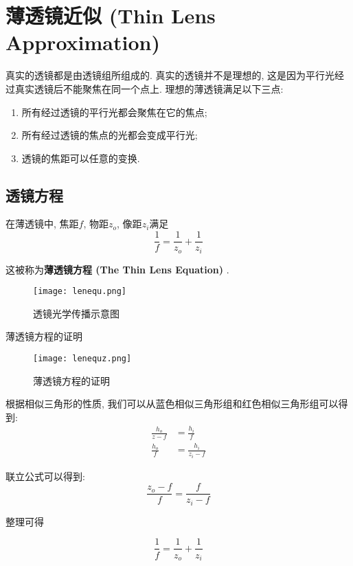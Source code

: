 \documentclass[openany]{progbookcn}
\begin{document}
\section{薄透镜近似 (Thin Lens Approximation) }

真实的透镜都是由透镜组所组成的. 真实的透镜并不是理想的, 这是因为平行光经过真实透镜后不能聚焦在同一个点上. 理想的薄透镜满足以下三点: 
\begin{enumerate}
	\item 所有经过透镜的平行光都会聚焦在它的焦点; 
	\item 所有经过透镜的焦点的光都会变成平行光; 
	\item 透镜的焦距可以任意的变换. 
\end{enumerate}

\subsection{透镜方程}

在薄透镜中, 焦距$f$, 物距$z_o$, 像距$z_i$满足
\begin{equation}
	\frac{1}{f}=\frac{1}{z_o}+\frac{1}{z_i}
\end{equation}

这被称为\textbf{薄透镜方程 (The Thin Lens Equation) }. 

\begin{figure}[H]
	\centering
	\texttt{[image: lenequ.png]}
	\caption{透镜光学传播示意图}
	\label{fig:lenequ}
\end{figure}

\begin{titledbox}{薄透镜方程的证明}
	
	\begin{figure}[H]
		\centering
		\texttt{[image: lenequz.png]}
		\caption{薄透镜方程的证明}
		\label{fig:lenequz}
	\end{figure}

根据相似三角形的性质, 我们可以从蓝色相似三角形组和红色相似三角形组可以得到: 
\begin{equation}
	\begin{split}
		\frac{h_o}{z-f}&=\frac{h_i}{f}\\
		\frac{h_o}{f}&=\frac{h_i}{z_i-f}
	\end{split}
\end{equation}

联立公式可以得到: 
\begin{equation}
	\frac{z_o-f}{f}=\frac{f}{z_i-f}
\end{equation}

整理可得

\begin{equation}
	\frac{1}{f}=\frac{1}{z_o}+\frac{1}{z_i}
\end{equation}
	
\end{titledbox}
\end{document}
